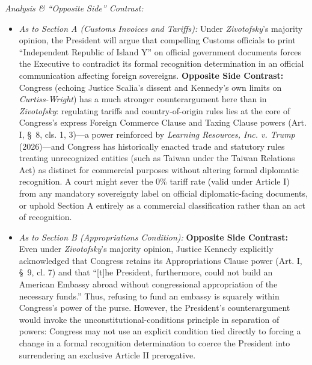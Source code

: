 \documentclass[12pt]{article}
\begin{document}
\textit{Analysis \& ``Opposite Side'' Contrast:}
\begin{itemize}
  \item \textit{As to Section A (Customs Invoices and Tariffs):} Under \textit{Zivotofsky}'s majority opinion, the President will argue that compelling Customs officials to print ``Independent Republic of Island Y'' on official government documents forces the Executive to contradict its formal recognition determination in an official communication affecting foreign sovereigns. \textbf{Opposite Side Contrast:} Congress (echoing Justice Scalia's dissent and Kennedy's own limits on \textit{Curtiss-Wright}) has a much stronger counterargument here than in \textit{Zivotofsky}: regulating tariffs and country-of-origin rules lies at the core of Congress's express Foreign Commerce Clause and Taxing Clause powers (Art. I, \S~8, cls. 1, 3)---a power reinforced by \textit{Learning Resources, Inc. v. Trump} (2026)---and Congress has historically enacted trade and statutory rules treating unrecognized entities (such as Taiwan under the Taiwan Relations Act) as distinct for commercial purposes without altering formal diplomatic recognition. A court might sever the 0\% tariff rate (valid under Article I) from any mandatory sovereignty label on official diplomatic-facing documents, or uphold Section A entirely as a commercial classification rather than an act of recognition.
  \item \textit{As to Section B (Appropriations Condition):} \textbf{Opposite Side Contrast:} Even under \textit{Zivotofsky}'s majority opinion, Justice Kennedy explicitly acknowledged that Congress retains its Appropriations Clause power (Art. I, \S~9, cl. 7) and that ``[t]he President, furthermore, could not build an American Embassy abroad without congressional appropriation of the necessary funds.'' Thus, refusing to fund an embassy is squarely within Congress's power of the purse. However, the President's counterargument would invoke the unconstitutional-conditions principle in separation of powers: Congress may not use an explicit condition tied directly to forcing a change in a formal recognition determination to coerce the President into surrendering an exclusive Article II prerogative.
\end{itemize}
\end{document}
